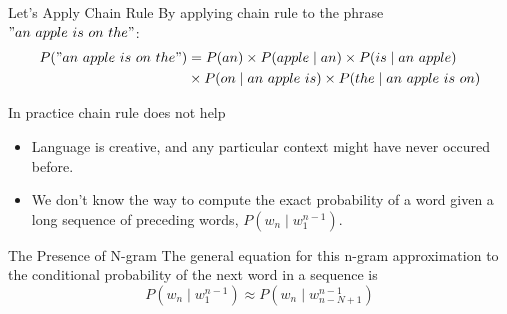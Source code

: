 \documentclass{beamer}
\begin{document}
\begin{frame}{Let's Apply Chain Rule}
    By applying chain rule to the phrase $"an\ apple\ is\ on\ the"$:
    \begin{align*}
        P("an\ apple\ is\ on\ the") &= P(an)\times P(apple\mid an) \times P(is\mid an\ apple)\\
                                  &\times P(on\mid an\ apple\ is) \times P(the\mid an\ apple\ is\ on) 
    \end{align*}
\end{frame}

\begin{frame}{In practice chain rule does not help}
    \begin{itemize}[<+->]
        \item Language is creative, and any particular context might have never occured before.
        \item We don't know the way to compute the exact probability of a word given a long sequence of preceding words, $P(w_n\mid w_1^{n-1})$.
    \end{itemize}


\end{frame}

\begin{frame}{The Presence of N-gram}
    The general equation for this n-gram approximation to the conditional probability of the next word in a sequence is
    $$P(w_n\mid w_1^{n-1}) \approx P(w_n\mid w_{n-N+1}^{n-1})$$


\end{frame}
\end{document}
